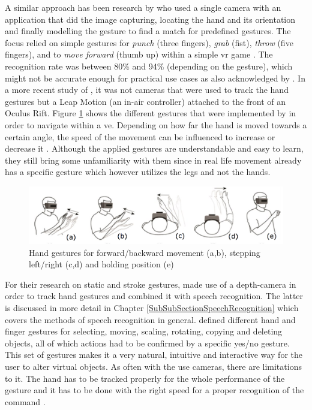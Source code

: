 \newline
A similar approach has been research by \cite{Rautaray2011} who used a single camera with an application that did the image capturing, locating the hand and its orientation and finally modelling the gesture to find a match for predefined gestures. The focus relied on simple gestures for \textit{punch} (three fingers), \textit{grab} (fist), \textit{throw} (five fingers), and to \textit{move forward} (thumb up) within a simple \gls{vr} game \citep{Rautaray2011}. The recognition rate was between 80\% and 94\% (depending on the gesture), which might not be accurate enough for practical use cases as also acknowledged by \cite{Rautaray2011}. \newline
In a more recent study of \cite{Khundam2015}, it was not cameras that were used to track the hand gestures but a Leap Motion (an in-air controller) attached to the front of an Oculus Rift. Figure \ref{fig:leapmotion} shows the different gestures that were implemented by \cite{Khundam2015} in order to navigate within a \gls{ve}. Depending on how far the hand is moved towards a certain angle, the speed of the movement can be influenced to increase or decrease it \citep{Khundam2015}. Although the applied gestures are understandable and easy to learn, they still bring some unfamiliarity with them since in real life movement already has a specific gesture which however utilizes the legs and not the hands.
\begin{figure}[h]
	\begin{center}
		\includegraphics[width=14cm]{03_Figures/05_LitReview/Khundam2015_LeapMotion.png}
		\caption[Hand gestures for forward/backward movement, stepping left/right and holding position]{Hand gestures for forward/backward movement (a,b), stepping left/right (c,d) and holding position (e) \citep{Khundam2015}}
		\label{fig:leapmotion}
	\end{center}
\end{figure}
\newline
For their research on static and stroke gestures, \cite{Chun2015} made use of a depth-camera in order to track hand gestures and combined it with speech recognition. The latter is discussed in more detail in Chapter \ref{SubSubSectionSpeechRecognition} which covers the methods of speech recognition in general. \cite{Chun2015} defined different hand and finger gestures for selecting, moving, scaling, rotating, copying and deleting objects, all of which actions had to be confirmed by a specific yes/no gesture. This set of gestures makes it a very natural, intuitive and interactive way for the user to alter virtual objects. As often with the use cameras, there are limitations to it. The hand has to be tracked properly for the whole performance of the gesture and it has to be done with the right speed for a proper recognition of the command \citep{Chun2015}.


